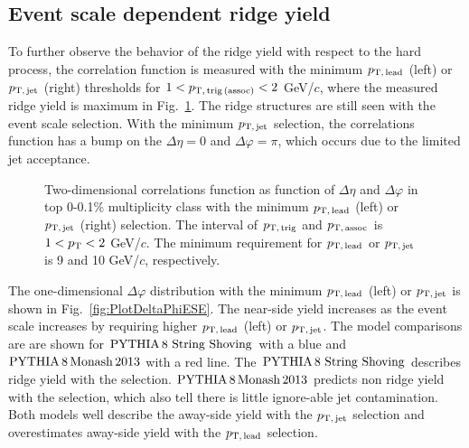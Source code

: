 \subsection{Event scale dependent ridge yield}

To further observe the behavior of the ridge yield with respect to the hard process, the correlation function is measured with the minimum $p_\mathrm{T,\,lead}$ (left) or $p_\mathrm{T,\,jet}$ (right) thresholds for $1<p_\mathrm{T,\,trig\,(assoc)}<2$ GeV/$c$, where the measured ridge yield is maximum in Fig.~\ref{fig:PlotCorrHMTSel}. The ridge structures are still seen with the event scale selection. With the minimum $p_\mathrm{T,\,jet}$ selection, the correlations function has a bump on the $\Delta\eta = 0$ and $\Delta\varphi = \pi$, which occurs due to the limited jet acceptance.

\begin{figure}[h!]
	\centering
	\caption{ Two-dimensional correlations function as function of $\Delta\eta$ and $\Delta\varphi$ in top 0-0.1\% multiplicity class with the minimum $p_\mathrm{T,\,lead}$ (left) or $p_\mathrm{T,\,jet}$ (right) selection. The interval of $p_\mathrm{T,\,trig}$ and $p_\mathrm{T,\,assoc}$ is $1<p_\mathrm{T}<2$ GeV/$c$. The minimum requirement for $p_\mathrm{T,\,lead}$ or $p_\mathrm{T,\,jet}$ is 9 and 10 GeV/$c$, respectively. }
	\label{fig:PlotCorrHMTSel}
\end{figure}

The one-dimensional $\Delta\varphi$ distribution with the minimum $p_\mathrm{T,\,lead}$ (left) or $p_\mathrm{T,\,jet}$ is shown in Fig.~\ref{fig:PlotDeltaPhiESE}. The near-side yield increases as the event scale increases by requiring higher $p_\mathrm{T,\,lead}$ (left) or $p_\mathrm{T,\,jet}$. The model comparisons are are shown for $\mathrm{PYTHIA}\,8~\mathrm{String}~\mathrm{Shoving}$ with a blue and $\mathrm{PYTHIA}\,8\,\mathrm{Monash}\,2013$ with a red line. The $\mathrm{PYTHIA}\,8~\mathrm{String}~\mathrm{Shoving}$ describes ridge yield with the selection. $\mathrm{PYTHIA}\,8\,\mathrm{Monash}\,2013$ predicts non ridge yield with the selection, which also tell there is little ignore-able jet contamination. Both models well describe the away-side yield with the $p_\mathrm{T,\,jet}$ selection and overestimates away-side yield with the $p_\mathrm{T,\,lead}$ selection.

